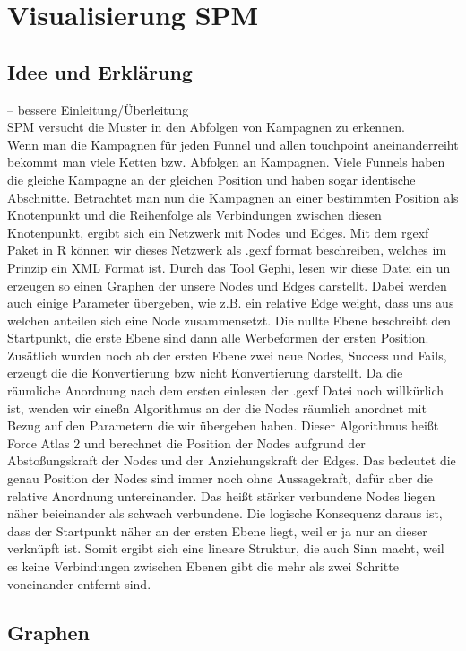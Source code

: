 \section{Visualisierung SPM}\label{Gephi}
\subsection{Idee und Erklärung}
-- bessere Einleitung/Überleitung\\
SPM versucht die Muster in den Abfolgen von Kampagnen zu erkennen.\\

Wenn man die Kampagnen für jeden Funnel und allen touchpoint aneinanderreiht bekommt man viele Ketten bzw. Abfolgen an Kampagnen. Viele Funnels haben die gleiche Kampagne an der gleichen Position und haben sogar identische Abschnitte. Betrachtet man nun die Kampagnen an einer bestimmten Position als Knotenpunkt und die Reihenfolge als Verbindungen zwischen diesen Knotenpunkt, ergibt sich ein Netzwerk mit Nodes und Edges. Mit dem rgexf Paket in R können wir dieses Netzwerk als .gexf format beschreiben, welches im Prinzip ein XML Format ist. Durch das Tool Gephi, lesen wir diese Datei ein un erzeugen so einen Graphen der unsere Nodes und Edges darstellt. Dabei werden auch einige Parameter übergeben, wie z.B. ein relative Edge weight, dass uns aus welchen anteilen sich eine Node zusammensetzt. Die nullte Ebene beschreibt den Startpunkt, die erste Ebene sind dann alle Werbeformen der ersten Position. Zusätlich wurden noch ab der ersten Ebene zwei neue Nodes, Success und Fails, erzeugt die die Konvertierung bzw nicht Konvertierung darstellt. Da die räumliche Anordnung nach dem ersten einlesen der .gexf Datei noch willkürlich ist, wenden wir eineßn Algorithmus an der die Nodes räumlich anordnet mit Bezug auf den Parametern die wir übergeben haben. Dieser Algorithmus heißt Force Atlas 2 und berechnet die Position der Nodes aufgrund der Abstoßungskraft der Nodes und der Anziehungskraft der Edges. Das bedeutet die genau Position der Nodes sind immer noch ohne Aussagekraft, dafür aber die relative Anordnung untereinander. Das heißt stärker verbundene Nodes liegen näher beieinander als schwach verbundene. Die logische Konsequenz daraus ist, dass der Startpunkt näher an der ersten Ebene liegt, weil er ja nur an dieser verknüpft ist. Somit ergibt sich eine lineare Struktur, die auch Sinn macht, weil es keine Verbindungen zwischen Ebenen gibt die mehr als zwei Schritte voneinander entfernt sind. 


\subsection{Graphen}
 


